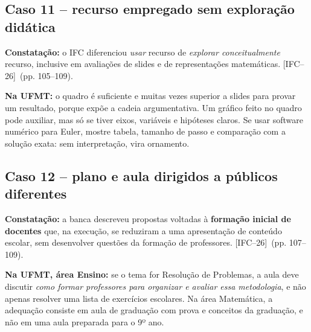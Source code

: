 \documentclass[11pt,a4paper]{article}
\newcommand{\fifc}{\textsf{[IFC--26]}}
\begin{document}
\subsection{Caso 11 -- recurso empregado sem exploração didática}
\textbf{Constatação:} o IFC diferenciou \emph{usar} recurso de \emph{explorar conceitualmente} recurso, inclusive em avaliações de slides e de representações matemáticas. \fifc\ (pp. 105--109).

\textbf{Na UFMT:} o quadro é suficiente e muitas vezes superior a slides para provar um resultado, porque expõe a cadeia argumentativa. Um gráfico feito no quadro pode auxiliar, mas só se tiver eixos, variáveis e hipóteses claros. Se usar software numérico para Euler, mostre tabela, tamanho de passo e comparação com a solução exata: sem interpretação, vira ornamento.

\subsection{Caso 12 -- plano e aula dirigidos a públicos diferentes}
\textbf{Constatação:} a banca descreveu propostas voltadas à \textbf{formação inicial de docentes} que, na execução, se reduziram a uma apresentação de conteúdo escolar, sem desenvolver questões da formação de professores. \fifc\ (pp. 107--109).

\textbf{Na UFMT, área Ensino:} se o tema for Resolução de Problemas, a aula deve discutir \emph{como formar professores para organizar e avaliar essa metodologia}, e não apenas resolver uma lista de exercícios escolares. Na área Matemática, a adequação consiste em aula de graduação com prova e conceitos da graduação, e não em uma aula preparada para o 9º ano.
\end{document}
